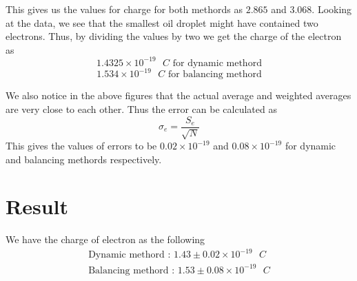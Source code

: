 \documentclass[12pt]{article}
\begin{document}
This gives us the values for charge for both methords as $2.865$ and $3.068$.
Looking at the data, we see that the smallest oil droplet might have contained two electrons.
Thus, by dividing the values by two we get the charge of the electron as 
\[1.4325 \times 10^{-19}\text{ $C$ for dynamic methord}\]
\[1.534 \times 10^{-19}\text{ $C$ for balancing methord}\]

We also notice in the above figures that the actual average and weighted averages are very close to each other.
Thus the error can be calculated as 
\[\sigma_e = \frac{S_e}{\sqrt{N}}\]
This gives the values of errors to be $0.02 \times 10^{-19}$ and $0.08 \times 10^{-19}$ for dynamic and balancing methords respectively.
\section*{Result}
We have the charge of electron as the following
\begin{align*}
    \text{Dynamic methord : }1.43 \pm 0.02 \times 10^{-19}\text{ $C$} \\
    \text{Balancing methord : }1.53 \pm 0.08 \times 10^{-19}\text{ $C$}
\end{align*}
\end{document}
